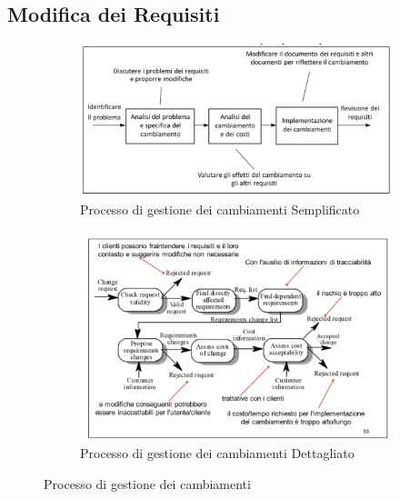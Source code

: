 \documentclass{article}
\begin{document}
	\subsection{Modifica dei Requisiti}
	\begin{figure}[h]
		\centering
		\begin{subfigure}[b]{0.45\textwidth}
			\centering
			\includegraphics[width=\textwidth]{17.proc_gest_camp_semp.png}
			\caption{Processo di gestione dei cambiamenti Semplificato}
			\label{fig:im-17}
		\end{subfigure}
		\hfill
		\begin{subfigure}[b]{0.45\textwidth}
			\centering
			\includegraphics[width=\textwidth]{18.proc_gest_camb_dett.png}
			\caption{Processo di gestione dei cambiamenti Dettagliato}
			\label{fig:im-18}
		\end{subfigure}
		\caption{Processo di gestione dei cambiamenti}
	\end{figure}
	
\end{document}
